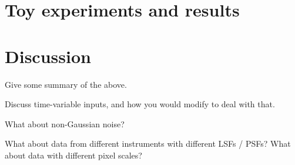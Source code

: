 \documentclass[11pt]{article}
\begin{document}
\section{Toy experiments and results}

\section{Discussion}

Give some summary of the above.

Discuss time-variable inputs, and how you would modify to deal with that.

What about non-Gaussian noise?

What about data from different instruments with different LSFs / PSFs? What about data with different pixel scales?
\end{document}
